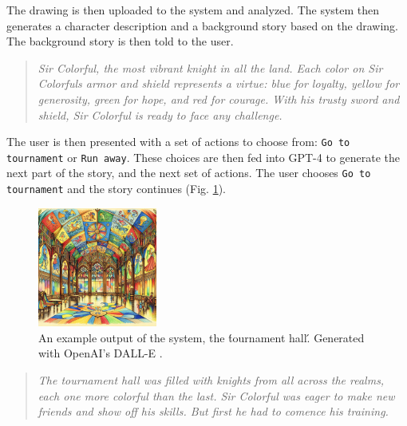 \documentclass[submit,techrep,english]{ipsj}
\begin{document}
The drawing is then uploaded to the system and analyzed. The system then generates a character description and a background story based on the drawing. The background story is then told to the user.

\vspace{10pt} %

\begin{quote}
    \textit{Sir Colorful, the most vibrant knight in all the land. Each color on Sir Colorfuls armor and shield represents a virtue: blue for loyalty, yellow for generosity, green for hope, and red for courage. With his trusty sword and shield, Sir Colorful is ready to face any challenge.}
\end{quote}

\vspace{10pt} %

The user is then presented with a set of actions to choose from: \verb|Go to tournament| or \verb|Run away|. These choices are then fed into GPT-4 to generate the next part of the story, and the next set of actions. The user chooses \verb|Go to tournament| and the story continues (Fig. \ref{fig:tournament}).

\vspace{10pt} %

\begin{figure}[h]
    \centering
    \includegraphics[width=0.35\textwidth]{figures/tournament-hall.png}
    \caption{An example output of the system, the \'tournament hall\'. Generated with OpenAI's DALL-E \cite{22:dalle}.}
    \label{fig:tournament}
\end{figure}

\begin{quote}
    \textit{The tournament hall was filled with knights from all across the realms, each one more colorful than the last. Sir Colorful was eager to make new friends and show off his skills. But first he had to comence his training.}
\end{quote}
\end{document}
